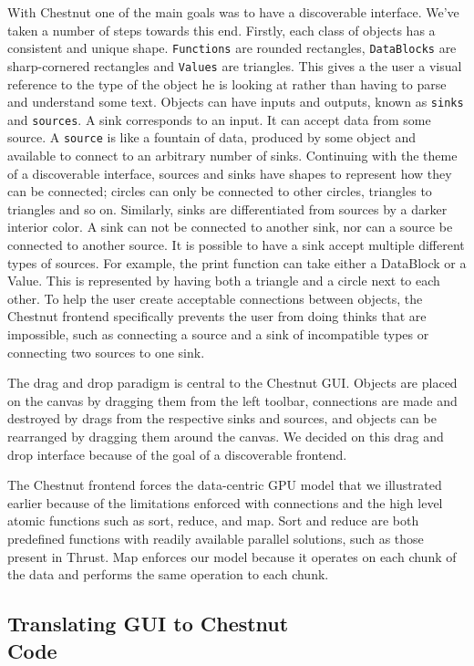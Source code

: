 \documentclass[twocolumn]{article}
\renewcommand{\|}{\origbar} %
\newcommand{\code}[1]{\texttt{#1}}
\begin{document}
With Chestnut one of the main goals was to have a discoverable interface. We've taken a number of steps towards this end. Firstly, each class of objects has a consistent and unique shape. \code{Functions} are rounded rectangles, \code{DataBlocks} are sharp-cornered rectangles and \code{Values} are triangles. This gives a the user a visual reference to the type of the object he is looking at rather than having to parse and understand some text. Objects can have inputs and outputs, known as \code{sinks} and \code{sources}. A sink corresponds to an input. It can accept data from some source. A \code{source} is like a fountain of data, produced by some object and available to connect to an arbitrary number of sinks. Continuing with the theme of a discoverable interface, sources and sinks have shapes to represent how they can be connected; circles can only be connected to other circles, triangles to triangles and so on. Similarly, sinks are differentiated from sources by a darker interior color. A sink can not be connected to another sink, nor can a source be connected to another source. It is possible to have a sink accept multiple different types of sources. For example, the print function can take either a DataBlock or a Value. This is represented by having both a triangle and a circle next to each other. To help the user create acceptable connections between objects, the Chestnut frontend specifically prevents the user from doing thinks that are impossible, such as connecting a source and a sink of incompatible types or connecting two sources to one sink.

The drag and drop paradigm is central to the Chestnut GUI. Objects are placed on the canvas by dragging them from the left toolbar, connections are made and destroyed by drags from the respective sinks and sources, and objects can be rearranged by dragging them around the canvas. We decided on this drag and drop interface because of the goal of a discoverable frontend. 

The Chestnut frontend forces the data-centric GPU model that we illustrated earlier because of the limitations enforced with connections and the high level atomic functions such as sort, reduce, and map. Sort and reduce are both predefined functions with readily available parallel solutions, such as those present in Thrust. Map enforces our model because it operates on each chunk of the data and performs the same operation to each chunk.

\if@twocolumn
\subsection{Translating GUI to Chestnut \\ Code}
\else
\end{document}
